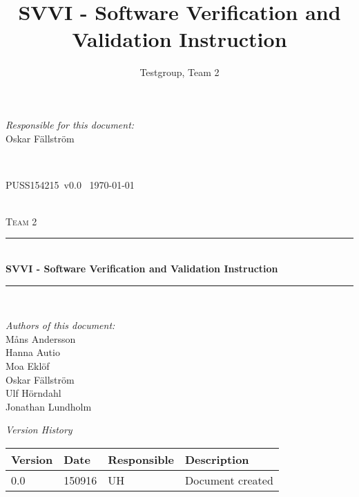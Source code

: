 \documentclass[a4paper]{article}
\title{SVVI - Software Verification and Validation Instruction}
\author{Testgroup, Team 2}
\newcommand{\version}{v0.0}
\newcommand{\SVVI}{PUSS154215}
\begin{document}
\begin{titlepage}
\newcommand{\HRule}{\rule{\linewidth}{0.5mm}}

\begin{minipage}{0.5\textwidth}
\begin{flushleft} %
\textit{Responsible for this document:}\\
Oskar Fällström %
\end{flushleft}
\end{minipage}
~
\begin{minipage}{0.4\textwidth}
\begin{flushright}
\SVVI\ \version\ %
\today
\end{flushright}
\end{minipage}\\[3cm]

\centering
\textsc{\LARGE Team 2}\\[0.5cm]

\HRule \\[0.4cm]
{ \huge \bfseries SVVI - Software Verification and Validation Instruction }\\[0.4cm] %
\HRule \\[1.5cm]

\vfill
\begin{flushleft}
\textit{Authors of this document:}\\
Måns Andersson \\
Hanna Autio \\
Moa Eklöf \\
Oskar Fällström \\
Ulf Hörndahl \\
Jonathan Lundholm
\end{flushleft}


\end{titlepage}

\begin{center}
\textit{\large Version History}

    \begin{tabular}{ | l | l | l | p{5cm} |}
    \hline
    \textbf{Version}	& \textbf{Date}	& \textbf{Responsible}		& \textbf{Description}					\\ \hline
    0.0						& 150916 			& UH									& Document created						\\ \hline
    \end{tabular}
\end{center}
\end{document}
